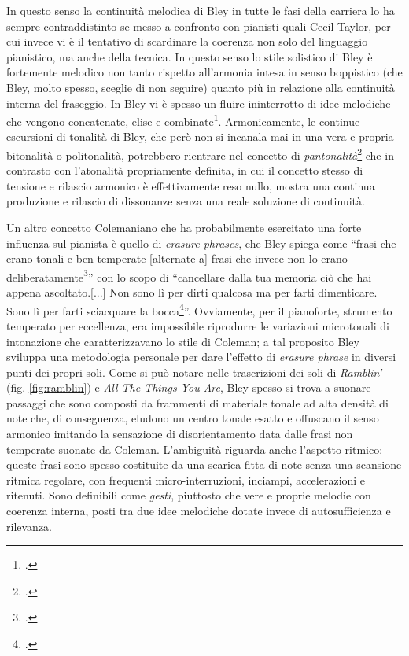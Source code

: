 In questo senso la continuità melodica di Bley in tutte le fasi della carriera lo ha sempre contraddistinto se messo a confronto con pianisti quali Cecil Taylor, per cui invece vi è il tentativo di scardinare la coerenza non solo del linguaggio pianistico, ma anche della tecnica. In questo senso lo stile solistico di Bley è fortemente melodico non tanto rispetto all'armonia intesa in senso boppistico (che Bley, molto spesso, sceglie di non seguire) quanto più in relazione alla continuità interna del fraseggio. In Bley vi è spesso un fluire ininterrotto di idee melodiche che vengono concatenate, elise e combinate\footcite[20]{meehan}. Armonicamente, le continue escursioni di tonalità di Bley, che però non si incanala mai in una vera e propria bitonalità o politonalità, potrebbero rientrare nel concetto di \textit{pantonalità}\footcite[73]{reti} che in contrasto con l'atonalità propriamente definita, in cui il concetto stesso di tensione e rilascio armonico è effettivamente reso nullo, mostra una continua produzione e rilascio di dissonanze senza una reale soluzione di continuità.\par
Un altro concetto Colemaniano che ha probabilmente esercitato una forte influenza sul pianista è quello di \textit{erasure phrases}, che Bley spiega come ``frasi che erano tonali e ben temperate [alternate a] frasi che invece non lo erano deliberatamente\footcite[67]{stopping}'' con lo scopo di ``cancellare dalla tua memoria ciò che hai appena ascoltato.[...] Non sono lì per dirti qualcosa ma per farti dimenticare. Sono lì per farti sciacquare la bocca\footcite[32]{meehan}''. Ovviamente, per il pianoforte, strumento temperato per eccellenza, era impossibile riprodurre le variazioni microtonali di intonazione che caratterizzavano lo stile di Coleman; a tal proposito Bley sviluppa una metodologia personale per dare l'effetto di \textit{erasure phrase} in diversi punti dei propri soli. Come si può notare nelle trascrizioni dei soli di \textit{Ramblin'} (fig. \ref{fig:ramblin}) e \textit{All The Things You Are}, Bley spesso si trova a suonare passaggi che sono composti da frammenti di materiale tonale ad alta densità di note che, di conseguenza, eludono un centro tonale esatto e offuscano il senso armonico imitando la sensazione di disorientamento data dalle frasi non temperate suonate da Coleman. L'ambiguità riguarda anche l'aspetto ritmico: queste frasi sono spesso costituite da una scarica fitta di note senza una scansione ritmica regolare, con frequenti micro-interruzioni, inciampi, accelerazioni e ritenuti. Sono definibili come \textit{gesti}, piuttosto che vere e proprie melodie con coerenza interna, posti tra due idee melodiche dotate invece di autosufficienza e rilevanza.\par 
